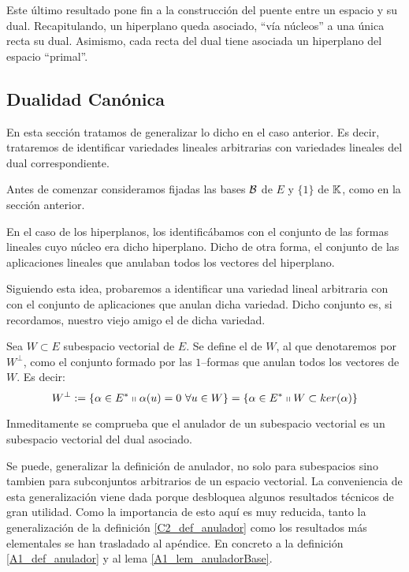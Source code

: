 Este último resultado pone fin a la construcción del puente entre un espacio y su dual. Recapitulando, un hiperplano queda asociado, ``vía núcleos'' a una única recta su dual. Asimismo, cada recta del dual tiene asociada un hiperplano del espacio ``primal''.
\subsection{Dualidad Canónica}

En esta sección tratamos de generalizar lo dicho en el caso anterior. Es decir, trataremos de identificar variedades lineales arbitrarias con variedades lineales del dual correspondiente.

Antes de comenzar consideramos fijadas las bases $\mathcal{B}$ de $E$ y $\{1\}$ de $\mathbb{K}$, como en la sección anterior. 

En el caso de los hiperplanos, los identificábamos con el conjunto de las formas lineales cuyo núcleo era dicho hiperplano. Dicho de otra forma, el conjunto de las aplicaciones lineales que anulaban todos los vectores del hiperplano.

Siguiendo esta idea, probaremos a identificar una variedad lineal arbitraria con con el conjunto de aplicaciones que anulan dicha variedad. Dicho conjunto es, si recordamos, nuestro viejo amigo el  de dicha variedad.

\begin{defi}
	\label{C2_def_anulador}
	Sea $W\subset E$ subespacio vectorial de $E$. Se define el  de $W$, al que denotaremos por $W^\perp$, como el conjunto formado por las $1$--formas que anulan todos los vectores de $W$. Es decir:
	\begin{equation}
	W^{\perp}:=\{\alpha\in E^*\shortparallel \alpha(u)=0 \ \forall u\in W\}=\{\alpha\in E^*\shortparallel W\subset ker(\alpha)\}
	\end{equation}
\end{defi}
Inmeditamente se comprueba que el anulador de un subespacio vectorial es un subespacio vectorial del dual asociado. 

\begin{obs}
	Se puede, generalizar la definición de anulador, no solo para subespacios sino tambien para subconjuntos arbitrarios de un espacio vectorial. La conveniencia de esta generalización viene dada porque desbloquea algunos resultados técnicos de gran utilidad. Como la importancia de esto aquí es muy reducida, tanto la generalización de la definición \ref{C2_def_anulador} como los resultados más elementales se han trasladado al apéndice. En concreto a la definición \ref{A1_def_anulador} y al lema \ref{A1_lem_anuladorBase}.
\end{obs}

